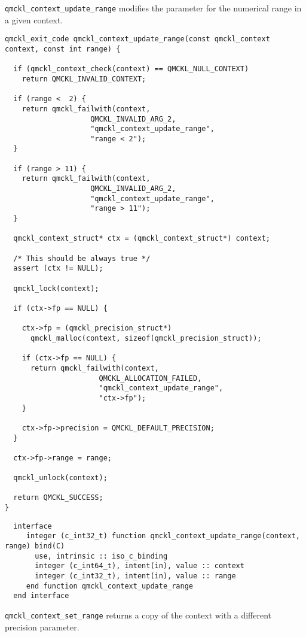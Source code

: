 \texttt{qmckl\_context\_update\_range} modifies the parameter for the numerical range in a given context.

\begin{verbatim}
qmckl_exit_code qmckl_context_update_range(const qmckl_context context, const int range) {

  if (qmckl_context_check(context) == QMCKL_NULL_CONTEXT)
    return QMCKL_INVALID_CONTEXT;

  if (range <  2) {
    return qmckl_failwith(context,
                    QMCKL_INVALID_ARG_2,
                    "qmckl_context_update_range",
                    "range < 2");
  }

  if (range > 11) {
    return qmckl_failwith(context,
                    QMCKL_INVALID_ARG_2,
                    "qmckl_context_update_range",
                    "range > 11");
  }

  qmckl_context_struct* ctx = (qmckl_context_struct*) context;

  /* This should be always true */
  assert (ctx != NULL);

  qmckl_lock(context);

  if (ctx->fp == NULL) {

    ctx->fp = (qmckl_precision_struct*)
      qmckl_malloc(context, sizeof(qmckl_precision_struct));

    if (ctx->fp == NULL) {
      return qmckl_failwith(context,
                      QMCKL_ALLOCATION_FAILED,
                      "qmckl_context_update_range",
                      "ctx->fp");
    }

    ctx->fp->precision = QMCKL_DEFAULT_PRECISION;
  }

  ctx->fp->range = range;

  qmckl_unlock(context);

  return QMCKL_SUCCESS;
}
\end{verbatim}

\begin{verbatim}
  interface
     integer (c_int32_t) function qmckl_context_update_range(context, range) bind(C)
       use, intrinsic :: iso_c_binding
       integer (c_int64_t), intent(in), value :: context
       integer (c_int32_t), intent(in), value :: range
     end function qmckl_context_update_range
  end interface
\end{verbatim}

\texttt{qmckl\_context\_set\_range} returns a copy of the context with a different precision parameter.

